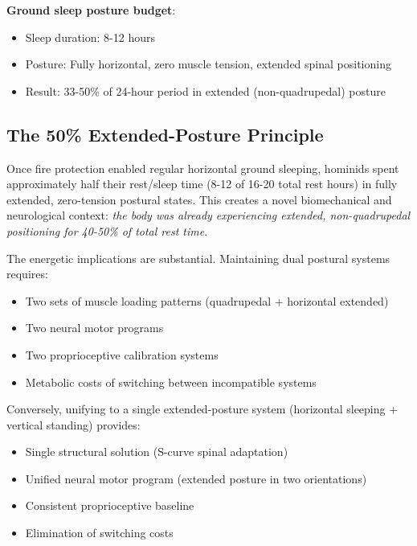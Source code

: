 \textbf{Ground sleep posture budget}:
\begin{itemize}
\item Sleep duration: 8-12 hours
\item Posture: Fully horizontal, zero muscle tension, extended spinal positioning
\item Result: 33-50\% of 24-hour period in extended (non-quadrupedal) posture
\end{itemize}

\subsection{The 50\% Extended-Posture Principle}

Once fire protection enabled regular horizontal ground sleeping, hominids spent approximately half their rest/sleep time (8-12 of 16-20 total rest hours) in fully extended, zero-tension postural states. This creates a novel biomechanical and neurological context: \textit{the body was already experiencing extended, non-quadrupedal positioning for 40-50\% of total rest time}.

The energetic implications are substantial. Maintaining dual postural systems requires:

\begin{itemize}
\item Two sets of muscle loading patterns (quadrupedal + horizontal extended)
\item Two neural motor programs
\item Two proprioceptive calibration systems
\item Metabolic costs of switching between incompatible systems
\end{itemize}

Conversely, unifying to a single extended-posture system (horizontal sleeping + vertical standing) provides:

\begin{itemize}
\item Single structural solution (S-curve spinal adaptation)
\item Unified neural motor program (extended posture in two orientations)
\item Consistent proprioceptive baseline
\item Elimination of switching costs
\end{itemize}






